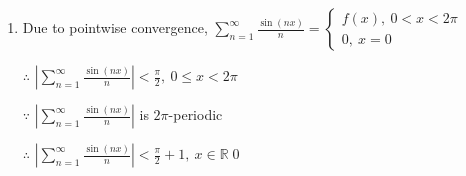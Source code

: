 \begin{enumerate}[1]
\begin{enumerate}[(1)]
        \item
        Due to pointwise convergence, $\sum\limits_{n=1}^\infty \frac{\sin (nx)}{n}=\begin{cases}f(x),\ 0<x<2\pi\\0,\ x=0 \end{cases}$
        \par $\therefore$ $\left|\sum\limits_{n=1}^\infty \frac{\sin (nx)}{n}\right|<\frac{\pi}{2},\ 0\leqslant x<2\pi$
        \par $\because$ $\left|\sum\limits_{n=1}^\infty \frac{\sin (nx)}{n}\right|$ is $2\pi$-periodic
        \par $\therefore$ $\left|\sum\limits_{n=1}^\infty \frac{\sin (nx)}{n}\right|<\frac{\pi}{2}+1,\ x\in \mathbb{R}$\qed
        \end{enumerate}
    \end{enumerate}

